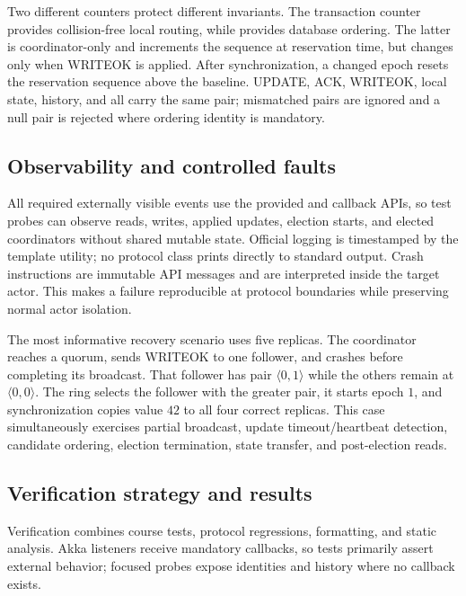 Two different counters protect different invariants. The transaction counter provides collision-free local routing, while  provides database ordering. The latter is coordinator-only and increments the sequence at reservation time, but  changes only when WRITEOK is applied. After synchronization, a changed epoch resets the reservation sequence above the baseline. UPDATE, ACK, WRITEOK, local state, history, and  all carry the same pair; mismatched pairs are ignored and a null pair is rejected where ordering identity is mandatory.

\subsection{Observability and controlled faults}

All required externally visible events use the provided  and callback APIs, so test probes can observe reads, writes, applied updates, election starts, and elected coordinators without shared mutable state. Official logging is timestamped by the template utility; no protocol class prints directly to standard output. Crash instructions are immutable API messages and are interpreted inside the target actor. This makes a failure reproducible at protocol boundaries while preserving normal actor isolation.

The most informative recovery scenario uses five replicas. The coordinator reaches a quorum, sends WRITEOK to one follower, and crashes before completing its broadcast. That follower has pair $\langle0,1\rangle$ while the others remain at $\langle0,0\rangle$. The ring selects the follower with the greater pair, it starts epoch $1$, and synchronization copies value $42$ to all four correct replicas. This case simultaneously exercises partial broadcast, update timeout/heartbeat detection, candidate ordering, election termination, state transfer, and post-election reads.

\clearpage
\subsection{Verification strategy and results}

Verification combines course tests, protocol regressions, formatting, and static analysis. Akka  listeners receive mandatory callbacks, so tests primarily assert external behavior; focused probes expose identities and history where no callback exists.

